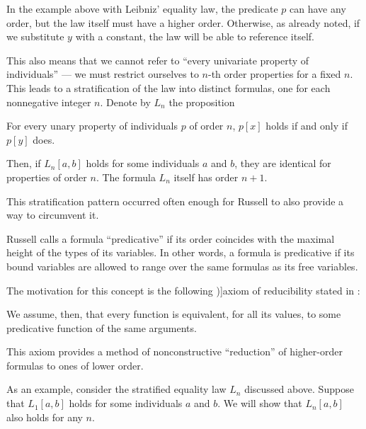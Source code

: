 \begin{concept}
\begin{thmenum}
    In the example above with Leibniz' equality law, the predicate \( p \) can have any order, but the law itself must have a higher order. Otherwise, as already noted, if we substitute \( y \) with a constant, the law will be able to reference itself.

    This also means that we cannot refer to \enquote{every univariate property of individuals} --- we must restrict ourselves to \( n \)-th order properties for a fixed \( n \). This leads to a stratification of the law into distinct formulas, one for each nonnegative integer \( n \). Denote by \( L_n \) the proposition
    \begin{displayquote}
      For every unary property of individuals \( p \) of order \( n \), \( p[x] \) holds if and only if \( p[y] \) does.
    \end{displayquote}

    Then, if \( L_n[a, b] \) holds for some individuals \( a \) and \( b \), they are identical for properties of order \( n \). The formula \( L_n \) itself has order \( n + 1 \).

    This stratification pattern occurred often enough for Russell to also provide a way to circumvent it.

     Russell calls a formula \enquote{predicative} if its order coincides with the maximal height of the types of its  variables. In other words, a formula is predicative if its bound variables are allowed to range over the same formulas as its free variables.

    The motivation for this concept is the following \term[en=axiom of reducibility (\cite[241]{Russell1908TypeTheory})]{axiom of reducibility} stated in \cite[241]{Russell1908TypeTheory}:
    \begin{displayquote}
      We assume, then, that every function is equivalent, for all its values, to some predicative function of the same arguments.
    \end{displayquote}

    This axiom provides a method of nonconstructive \enquote{reduction} of higher-order formulas to ones of lower order.

    As an example, consider the stratified equality law \( L_n \) discussed above. Suppose that \( L_1[a, b] \) holds for some individuals \( a \) and \( b \). We will show that \( L_n[a, b] \) also holds for any \( n \).


\end{thmenum}
\end{concept}
